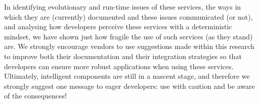 In identifying evolutionary and run-time issues of these services, the ways in which they are (currently) documented and these issues communicated (or not), and analysing how developers perceive these services with a deterministic mindset, we have shown just how fragile the use of such services (as they stand) are. We strongly encourage vendors to use suggestions made within this research to improve both their documentation and their integration strategies so that developers can ensure more robust applications when using these services. Ultimately, intelligent  components are still in a nascent stage, and therefore we strongly suggest one message to eager developers: use with caution and be aware of the consequences!
